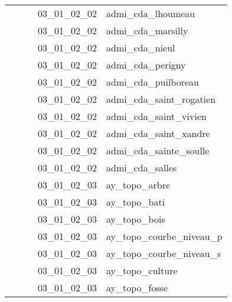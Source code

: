 \documentclass[12pt,titlepage,oneside]{book}
\begin{document}
\begin{supertabular}{|p{7.5cm}|p{7.5cm}|p{7.5cm}|c|p{10cm}|}
                   &                    &                    & 03\_01\_02\_02 & admi\_cda\_lhoumeau\\
                   &                    &                    & 03\_01\_02\_02 & admi\_cda\_marsilly\\
                   &                    &                    & 03\_01\_02\_02 & admi\_cda\_nieul\\
                   &                    &                    & 03\_01\_02\_02 & admi\_cda\_perigny\\
                   &                    &                    & 03\_01\_02\_02 & admi\_cda\_puilboreau\\
                   &                    &                    & 03\_01\_02\_02 & admi\_cda\_saint\_rogatien\\
                   &                    &                    & 03\_01\_02\_02 & admi\_cda\_saint\_vivien\\
                   &                    &                    & 03\_01\_02\_02 & admi\_cda\_saint\_xandre\\
                   &                    &                    & 03\_01\_02\_02 & admi\_cda\_sainte\_soulle\\
                   &                    &                    & 03\_01\_02\_02 & admi\_cda\_salles\\
                   &                    &                    & 03\_01\_02\_03 & ay\_topo\_arbre\\
                   &                    &                    & 03\_01\_02\_03 & ay\_topo\_bati\\
                   &                    &                    & 03\_01\_02\_03 & ay\_topo\_bois\\
                   &                    &                    & 03\_01\_02\_03 & ay\_topo\_courbe\_niveau\_p\\
                   &                    &                    & 03\_01\_02\_03 & ay\_topo\_courbe\_niveau\_s\\
                   &                    &                    & 03\_01\_02\_03 & ay\_topo\_culture\\
                   &                    &                    & 03\_01\_02\_03 & ay\_topo\_fosse\\

\end{supertabular}
\end{document}
